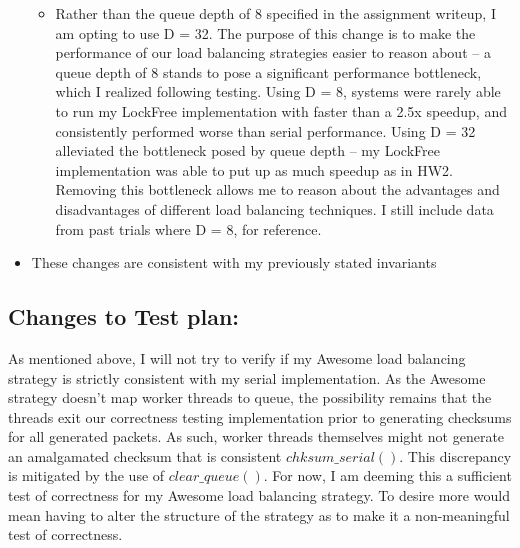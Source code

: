\documentclass[]{article}
\begin{document}
\begin{itemize}
\begin{itemize}
		\item Rather than the queue depth of 8 specified in the assignment writeup, I am opting to use D = 32. The purpose of this change is to make the performance of our load balancing strategies easier to reason about -- a queue depth of 8 stands to pose a significant performance bottleneck, which I realized following testing. Using D = 8, systems were rarely able to run my LockFree implementation with faster than a 2.5x speedup, and consistently performed worse than serial performance. Using D = 32 alleviated the bottleneck posed by queue depth -- my LockFree implementation was able to put up as much speedup as in HW2. Removing this bottleneck allows me to reason about the advantages and disadvantages of different load balancing techniques. I still include data from past trials where D = 8, for reference.
	\end{itemize}
	\item These changes are consistent with my previously stated invariants
\end{itemize}

\subsection{Changes to Test plan:}
As mentioned above, I will not try to verify if my Awesome load balancing strategy is strictly consistent with my serial implementation. As the Awesome strategy doesn't map worker threads to queue, the possibility remains that the threads exit our correctness testing implementation prior to generating checksums for all generated packets. As such, worker threads themselves might not generate an amalgamated checksum that is consistent $chksum\_serial()$. This discrepancy is mitigated by the use of $clear\_queue()$. For now, I am deeming this a sufficient test of correctness for my Awesome load balancing strategy. To desire more would mean having to alter the structure of the strategy as to make it a non-meaningful test of correctness.
\end{document}
